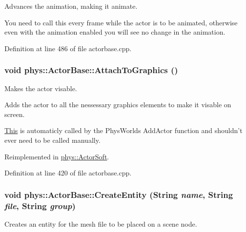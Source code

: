 Advances the animation, making it animate. 

You need to call this every frame while the actor is to be animated, otherwise even with the animation enabled you will see no change in the animation. 

Definition at line 486 of file actorbase.cpp.

\hypertarget{classphys_1_1ActorBase_a45f190cb9b647bb3385d1298f9dab589}{
\subsubsection[{AttachToGraphics}]{\setlength{\rightskip}{0pt plus 5cm}void phys::ActorBase::AttachToGraphics ()}}
\label{d8/d0f/classphys_1_1ActorBase_a45f190cb9b647bb3385d1298f9dab589}


Makes the actor visable. 

Adds the actor to all the nessessary graphics elements to make it visable on screen. \par
 \hyperlink{structThis}{This} is automaticly called by the PhysWorlds AddActor function and shouldn't ever need to be called manually. 

Reimplemented in \hyperlink{classphys_1_1ActorSoft_a37b3bf631e8f73b3f19c3bb043d011c3}{phys::ActorSoft}.



Definition at line 420 of file actorbase.cpp.

\hypertarget{classphys_1_1ActorBase_aff7dbb190fb982a43123bee3066501c4}{
\subsubsection[{CreateEntity}]{\setlength{\rightskip}{0pt plus 5cm}void phys::ActorBase::CreateEntity ({\bf String} {\em name}, \/  {\bf String} {\em file}, \/  {\bf String} {\em group})}}
\label{d8/d0f/classphys_1_1ActorBase_aff7dbb190fb982a43123bee3066501c4}


Creates an entity for the mesh file to be placed on a scene node. 

